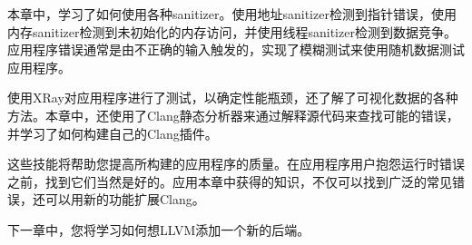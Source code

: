 本章中，学习了如何使用各种sanitizer。使用地址sanitizer检测到指针错误，使用内存sanitizer检测到未初始化的内存访问，并使用线程sanitizer检测到数据竞争。应用程序错误通常是由不正确的输入触发的，实现了模糊测试来使用随机数据测试应用程序。\par

使用XRay对应用程序进行了测试，以确定性能瓶颈，还了解了可视化数据的各种方法。本章中，还使用了Clang静态分析器来通过解释源代码来查找可能的错误，并学习了如何构建自己的Clang插件。\par

这些技能将帮助您提高所构建的应用程序的质量。在应用程序用户抱怨运行时错误之前，找到它们当然是好的。应用本章中获得的知识，不仅可以找到广泛的常见错误，还可以用新的功能扩展Clang。\par

下一章中，您将学习如何想LLVM添加一个新的后端。\par

\newpage
